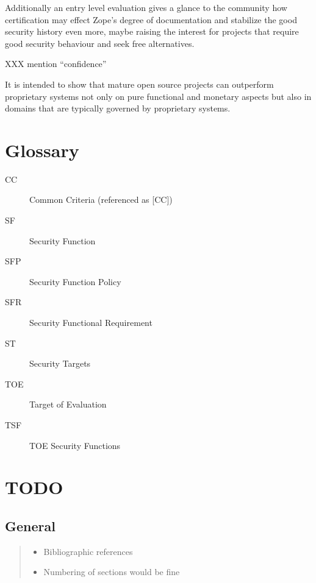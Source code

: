 \documentclass[12pt,english]{scrbook}
\begin{document}
Additionally an entry level evaluation gives a glance to the community how
certification may effect Zope's degree of documentation and stabilize the good
security history even more, maybe raising the interest for projects that
require good security behaviour and seek free alternatives.

XXX mention ``confidence''

It is intended to show that mature open source projects can outperform
proprietary systems not only on pure functional and monetary aspects but also
in domains that are typically governed by proprietary systems.





\chapter{Glossary}

\begin{description}

  \item[CC] Common Criteria (referenced as {[}CC])
  \item[SF] Security Function
  \item[SFP] Security Function Policy
  \item[SFR] Security Functional Requirement
  \item[ST] Security Targets
  \item[TOE] Target of Evaluation
  \item[TSF] TOE Security Functions

\end{description} 




\chapter{TODO}





\section{General}
\begin{quote}
\begin{itemize}
\item {} 
Bibliographic references

\item {} 
Numbering of sections would be fine

\end{itemize}
\end{quote}
\end{document}
